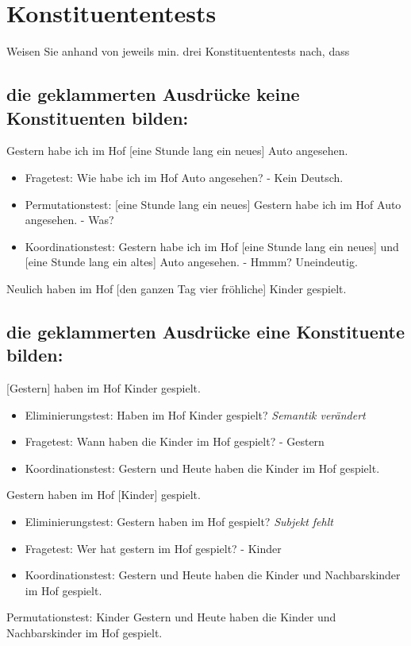 \section{Konstituententests}

Weisen Sie anhand von jeweils min. drei Konstituententests nach, dass

\subsection{die geklammerten Ausdrücke keine Konstituenten bilden:}

Gestern habe ich im Hof [eine Stunde lang ein neues] Auto angesehen.
\begin{itemize}
  \item Fragetest: Wie habe ich im Hof Auto angesehen? - Kein Deutsch.
  \item Permutationstest: [eine Stunde lang ein neues] Gestern habe ich im Hof Auto angesehen. - Was?
  \item Koordinationstest: Gestern habe ich im Hof [eine Stunde lang ein neues] und [eine Stunde lang ein altes] Auto angesehen. - Hmmm? Uneindeutig.
\end{itemize}

Neulich haben im Hof [den ganzen Tag vier fröhliche] Kinder gespielt.


\subsection{die geklammerten Ausdrücke eine Konstituente bilden:}
[Gestern] haben im Hof Kinder gespielt.
\begin{itemize}
  \item Eliminierungstest: Haben im Hof Kinder gespielt? \textit{Semantik verändert}
  \item Fragetest: Wann haben die Kinder im Hof gespielt? - Gestern
  \item Koordinationstest: Gestern und Heute haben die Kinder im Hof gespielt.
\end{itemize}


Gestern haben im Hof [Kinder] gespielt.
\begin{itemize}
  \item Eliminierungstest: Gestern haben im Hof gespielt? \textit{Subjekt fehlt}
  \item Fragetest: Wer hat gestern im Hof gespielt? - Kinder
  \item Koordinationstest: Gestern und Heute haben die Kinder und Nachbarskinder im Hof gespielt.
\end{itemize}
Permutationstest: Kinder Gestern und Heute haben die Kinder und Nachbarskinder im Hof gespielt.

